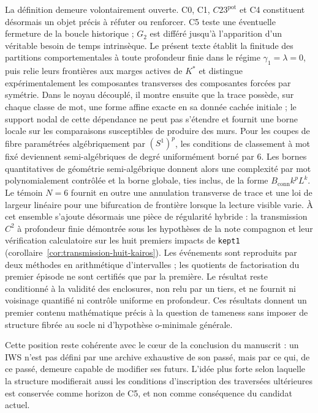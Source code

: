\documentclass[11pt,a4paper]{article}
\theoremstyle{definition}
\theoremstyle{remark}
\begin{document}
La définition demeure volontairement ouverte. C0, C1, $C23^{\mathrm{pot}}$ et C4 constituent désormais un objet précis à réfuter ou renforcer. C5 teste une éventuelle fermeture de la boucle historique ; $G_2$ est différé jusqu'à l'apparition d'un véritable besoin de temps intrinsèque. Le présent texte établit la finitude des partitions comportementales à toute profondeur finie dans le régime $\gamma_1=\lambda=0$, puis relie leurs frontières aux marges actives de $K^*$ et distingue expérimentalement les composantes transverses des composantes forcées par symétrie. Dans le noyau découplé, il montre ensuite que la trace possède, sur chaque classe de mot, une forme affine exacte en sa donnée cachée initiale ; le support nodal de cette dépendance ne peut pas s'étendre et fournit une borne locale sur les comparaisons susceptibles de produire des murs. Pour les coupes de fibre paramétrées algébriquement par $(S^1)^p$, les conditions de classement à mot fixé deviennent semi-algébriques de degré uniformément borné par $6$. Les bornes quantitatives de géométrie semi-algébrique donnent alors une complexité par mot polynomialement contrôlée et la borne globale, ties inclus, de la forme $B_{\mathrm{conn}} k^pL^k$. Le témoin $N=6$ fournit en outre une annulation transverse de trace et une loi de largeur linéaire pour une bifurcation de frontière lorsque la lecture visible varie. À cet ensemble s'ajoute désormais une pièce de régularité hybride : la transmission $C^2$ à profondeur finie démontrée sous les hypothèses de la note compagnon et leur vérification calculatoire sur les huit premiers impacts de \texttt{kept1} (corollaire~\ref{cor:transmission-huit-kairos}). Les événements sont reproduits par deux méthodes en arithmétique d'intervalles ; les quotients de factorisation du premier épisode ne sont certifiés que par la première. Le résultat reste conditionné à la validité des enclosures, non relu par un tiers, et ne fournit ni voisinage quantifié ni contrôle uniforme en profondeur. Ces résultats donnent un premier contenu mathématique précis à la question de tameness sans imposer de structure fibrée au socle ni d'hypothèse o-minimale générale.

Cette position reste cohérente avec le cœur de la conclusion du manuscrit : un IWS n'est pas défini par une archive exhaustive de son passé, mais par ce qui, de ce passé, demeure capable de modifier ses futurs. L'idée plus forte selon laquelle la structure modifierait aussi les conditions d'inscription des traversées ultérieures est conservée comme horizon de C5, et non comme conséquence du candidat actuel.
\end{document}
